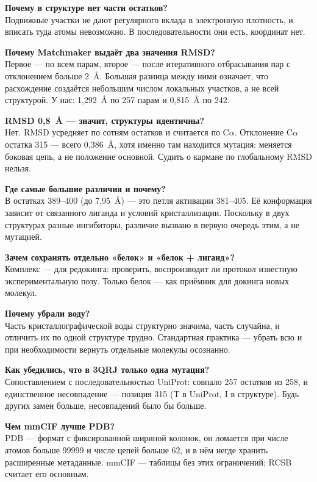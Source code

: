 \documentclass[12pt,a4paper]{article}
\newcommand{\code}[1]{{\ttfamily #1}}
\begin{document}
\medskip
\textbf{Почему в структуре нет части остатков?}\\
Подвижные участки не дают регулярного вклада в электронную плотность, и вписать
туда атомы невозможно. В последовательности они есть, координат нет.

\medskip
\textbf{Почему Matchmaker выдаёт два значения RMSD?}\\
Первое --- по всем парам, второе --- после итеративного отбрасывания пар с
отклонением больше 2~\AA. Большая разница между ними означает, что расхождение
создаётся небольшим числом локальных участков, а не всей структурой. У нас:
1{,}292~\AA{} по 257 парам и 0{,}815~\AA{} по 242.

\medskip
\textbf{RMSD 0{,}8~\AA{} --- значит, структуры идентичны?}\\
Нет. RMSD усредняет по сотням остатков и считается по C$\alpha$. Отклонение
C$\alpha$ остатка 315 --- всего 0{,}386~\AA, хотя именно там находится мутация:
меняется боковая цепь, а не положение основной. Судить о кармане по глобальному
RMSD нельзя.

\medskip
\textbf{Где самые большие различия и почему?}\\
В остатках 389--400 (до 7{,}95~\AA) --- это петля активации 381--405. Её
конформация зависит от связанного лиганда и условий кристаллизации. Поскольку в
двух структурах разные ингибиторы, различие вызвано в первую очередь этим, а не
мутацией.

\medskip
\textbf{Зачем сохранять отдельно «белок» и «белок + лиганд»?}\\
Комплекс --- для редокинга: проверить, воспроизводит ли протокол известную
экспериментальную позу. Только белок --- как приёмник для докинга новых молекул.

\medskip
\textbf{Почему убрали воду?}\\
Часть кристаллографической воды структурно значима, часть случайна, и отличить их
по одной структуре трудно. Стандартная практика --- убрать всю и при необходимости
вернуть отдельные молекулы осознанно.

\medskip
\textbf{Как убедились, что в 3QRJ только одна мутация?}\\
Сопоставлением с последовательностью UniProt: совпало 257 остатков из 258, и
единственное несовпадение --- позиция 315 (\code{T} в UniProt, \code{I} в
структуре). Будь других замен больше, несовпадений было бы больше.

\medskip
\textbf{Чем mmCIF лучше PDB?}\\
PDB --- формат с фиксированной шириной колонок, он ломается при числе атомов
больше 99999 и числе цепей больше 62, и в нём негде хранить расширенные метаданные.
mmCIF --- таблицы без этих ограничений; RCSB считает его основным.
\end{document}
